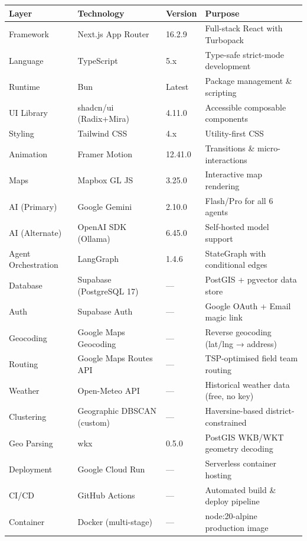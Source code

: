 \documentclass[11pt,a4paper]{article}
\newcommand{\thead}[1]{{\color{white}\bfseries\sffamily #1}}
\begin{document}
\begin{longtable}{@{} L{3cm} L{4cm} L{2.2cm} L{5.4cm} @{}}
\toprule
{}
\thead{Layer} & \thead{Technology} & \thead{Version} & \thead{Purpose} \\
\midrule
\endhead
Framework          & Next.js App Router    & 16.2.9  & Full-stack React with Turbopack \\
Language           & TypeScript            & 5.x     & Type-safe strict-mode development \\
Runtime            & Bun                   & Latest  & Package management \& scripting \\
UI Library         & shadcn/ui (Radix+Mira)& 4.11.0  & Accessible composable components \\
Styling            & Tailwind CSS          & 4.x     & Utility-first CSS \\
Animation          & Framer Motion         & 12.41.0 & Transitions \& micro-interactions \\
Maps               & Mapbox GL JS          & 3.25.0  & Interactive map rendering \\
AI (Primary)       & Google Gemini         & 2.10.0  & Flash/Pro for all 6 agents \\
AI (Alternate)     & OpenAI SDK (Ollama)   & 6.45.0  & Self-hosted model support \\
Agent Orchestration& LangGraph             & 1.4.6   & StateGraph with conditional edges \\
Database           & Supabase (PostgreSQL 17) & —    & PostGIS + pgvector data store \\
Auth               & Supabase Auth         & —       & Google OAuth + Email magic link \\
Geocoding          & Google Maps Geocoding & —       & Reverse geocoding (lat/lng → address) \\
Routing            & Google Maps Routes API& —       & TSP-optimised field team routing \\
Weather            & Open-Meteo API        & —       & Historical weather data (free, no key) \\
Clustering         & Geographic DBSCAN (custom) & — & Haversine-based district-constrained \\
Geo Parsing        & wkx                   & 0.5.0   & PostGIS WKB/WKT geometry decoding \\
Deployment         & Google Cloud Run      & —       & Serverless container hosting \\
CI/CD              & GitHub Actions        & —       & Automated build \& deploy pipeline \\
Container          & Docker (multi-stage)  & —       & node:20-alpine production image \\
\bottomrule
\end{longtable}
\end{document}
